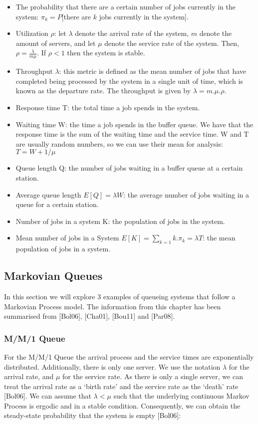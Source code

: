\documentclass[a4paper,11pt,titlepage]{article}
\begin{document}
\begin{itemize}
    \item The probability that there are a certain number of jobs currently in the system: $\pi_k = P$[there are $k$ jobs currently in the system].
    \item Utilization $\rho$: let $\lambda$ denote the arrival rate of the system, $m$ denote the amount of servers, and let $\mu$ denote the service rate of the system. Then, $\rho = \frac{\lambda}{m \mu}$. If $\rho < 1$ then the system is stable.
    \item Throughput $\lambda$: this metric is defined as the mean number of jobs that have completed being processed by the system in a single unit of time, which is known as the departure rate. The throughput is given by $\lambda = m.\mu.\rho$.
    \item Response time T: the total time a job spends in the system. 
    \item Waiting time W: the time a job spends in the buffer queue. We have that the response time is the sum of the waiting time and the service time. W and T are usually random numbers, so we can use their mean for analysis: $T = W + 1/\mu$
    \item Queue length Q: the number of jobs waiting in a buffer queue at a certain station.
    \item Average queue length $E[Q] = \lambda W$: the average number of jobs waiting in a queue for a certain station.
    \item Number of jobs in a system K: the population of jobs in the system.
    \item Mean number of jobs in a System $E[K] = \sum_{k=1} k.\pi_k = \lambda T$: the mean population of jobs in a system.
\end{itemize}

\subsection{Markovian Queues}

In this section we will explore 3 examples of queueing systems that follow a Markovian Process model. The information from this chapter has been summarised from [Bol06], [Cha01], [Bou11] and [Par08]. 

\subsubsection{M/M/1 Queue}

For the M/M/1 Queue the arrival process and the service times are exponentially distributed. Additionally, there is only one server. We use the notation $\lambda$ for the arrival rate, and $\mu$ for the service rate. As there is only a single server, we can treat the arrival rate as a `birth rate' and the service rate as the `death' rate [Bol06]. We can assume that $\lambda < \mu$ such that the underlying continuous Markov Process is ergodic and in a stable condition. Consequently, we can obtain the steady-state probability that the system is empty [Bol06]: 
\end{document}
